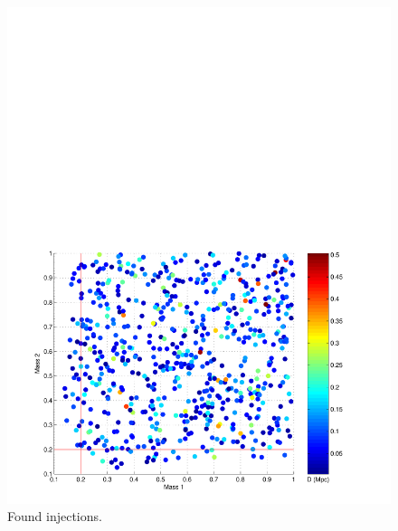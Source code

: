\begin{figure}[p]
\begin{center}
\includegraphics[width=\textwidth]{figures/result/m1m2_found}
\end{center}
\caption[Simulated Signals Detected by Pipeline]{%
\label{f:m1m2_found}
Found injections.
}
\end{figure}

